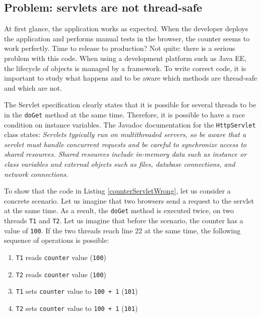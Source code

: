 \subsection{Problem: servlets are not thread-safe}


At first glance, the application works as expected. When the developer deploys the application and performs manual tests in the browser, the counter seems to work perfectly. Time to release to production? Not quite: there is a serious problem with this code. When using a development platform such as Java EE, the lifecycle of objects is managed by a framework. To write correct code, it is important to study what happens and to be aware which methods are thread-safe and which are not.

The Servlet specification clearly states that it is possible for several threads to be in the \texttt{doGet} method at the same time. Therefore, it is possible to have a race condition on instance variables. The Javadoc documentation for the \texttt{HttpServlet} class states: \emph{Servlets typically run on multithreaded servers, so be aware that a servlet must handle concurrent requests and be careful to synchronize access to shared resources. Shared resources include in-memory data such as instance or class variables and external objects such as files, database connections, and network connections.}

To show that the code in Listing \ref{counterServletWrong}, let us consider a concrete scenario. Let us imagine that two browsers send a request to the servlet at the same time. As a result, the \texttt{doGet} method is executed twice, on two threads \texttt{T1} and \texttt{T2}. Let us imagine that before the scenario, the counter has a value of \texttt{100}. If the two threads reach line 22 at the same time, the following sequence of operations is possible: 

\begin{enumerate}
\item \texttt{T1} reads \texttt{counter} value (\texttt{100})
\item \texttt{T2} reads \texttt{counter} value (\texttt{100})
\item \texttt{T1} sets \texttt{counter} value to \texttt{100 + 1} (\texttt{101})
\item \texttt{T2} sets \texttt{counter} value to \texttt{100 + 1} (\texttt{101})
\end{enumerate}

